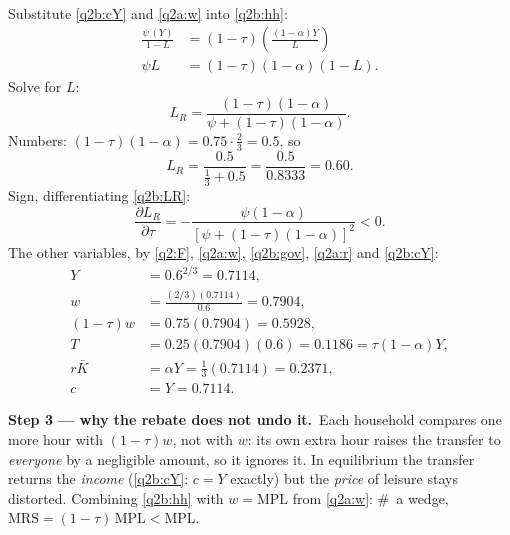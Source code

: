 \documentclass[11pt,a4paper]{article}
\newcommand{\passo}[2]{\par\smallskip\noindent\textbf{Step #1.}~#2}
\begin{document}
\begin{sol}
{\begin{align}
\end{align}
Substitute \eqref{q2b:cY} and \eqref{q2a:w} into \eqref{q2b:hh}:
\begin{align*}
\frac{\psi\,(Y)}{1-L} &= (1-\tau)\left(\frac{(1-\alpha)Y}{L}\right)\\
\psi L &= (1-\tau)(1-\alpha)(1-L).
\end{align*}
Solve for $L$:
\begin{equation}
\boxed{L_R=\frac{(1-\tau)(1-\alpha)}{\psi+(1-\tau)(1-\alpha)}}. \label{q2b:LR}
\end{equation}
Numbers: $(1-\tau)(1-\alpha)=0.75\cdot\tfrac23=0.5$, so
\[
L_R=\frac{0.5}{\frac13+0.5}=\frac{0.5}{0.8333}=\boxed{0.60}.
\]
Sign, differentiating \eqref{q2b:LR}:
\[
\frac{\partial L_R}{\partial\tau}=-\frac{\psi(1-\alpha)}{[\psi+(1-\tau)(1-\alpha)]^2}<0.
\]
The other variables, by \eqref{q2:F}, \eqref{q2a:w}, \eqref{q2b:gov}, \eqref{q2a:r} and \eqref{q2b:cY}:
\begin{align*}
Y &= 0.6^{2/3}=0.7114,\\
w &= \frac{(2/3)(0.7114)}{0.6}=0.7904,\\
(1-\tau)w &= 0.75(0.7904)=0.5928,\\
T &= 0.25(0.7904)(0.6)=0.1186=\tau(1-\alpha)Y,\\
r\bar K &= \alpha Y=\tfrac13(0.7114)=0.2371,\\
c &= Y=0.7114.
\end{align*}}
\passo{3 --- why the rebate does not undo it}{Each household compares one more hour with $(1-\tau)w$, not
with $w$: its own extra hour raises the transfer to \emph{everyone} by a negligible amount, so it ignores it.
In equilibrium the transfer returns the \emph{income} (\eqref{q2b:cY}: $c=Y$ exactly) but the \emph{price} of
leisure stays distorted. Combining \eqref{q2b:hh} with $w=\text{MPL}$ from \eqref{q2a:w}:
\#~a wedge, $\text{MRS}=(1-\tau)\,\text{MPL}<\text{MPL}$.}
\begin{center}
\end{center}
\end{sol}
\end{document}
